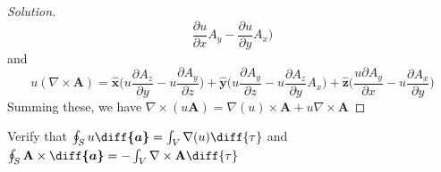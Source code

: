 \documentclass[crop=false,class=article,oneside]{standalone}
\begin{document}
\begin{proof}[Solution]
\begin{equation*}
                    \frac{\partial u}{\partial x}A_{y}
                    -\frac{\partial u}{\partial y}A_{x}
                \big)
            \end{equation*}
            and
            \begin{equation*}
                u(\nabla\times\mathbf{A})
                =\hat{\mathbf{x}}\big(
                    u\frac{\partial{A_{z}}}{\partial{y}}
                    -u\frac{\partial{A_{y}}}{\partial{z}}
                \big)
                +\hat{\mathbf{y}}\big(
                    u\frac{\partial{A_{y}}}{\partial{z}}
                    -u\frac{\partial{A_{z}}}{\partial{y}}A_{x}
                \big)
                +\hat{\mathbf{z}}\big(
                    \frac{u\partial{A_{y}}}{\partial{x}}
                    -u\frac{\partial{A_{x}}}{\partial{y}}
                \big)
            \end{equation*}
            Summing these, we have
            $\nabla\times(u\mathbf{A})%
             =\nabla(u)\times\mathbf{A}%
             +u\nabla\times\mathbf{A}$
        \end{proof}
        \begin{problem}[Wangsness 1-26]
            Verify that
            $\oint_{S}u\boldsymbol{\diff{a}}%
             =\int_{V}\nabla(u)\diff{\tau}$
            and
            $\oint_{S}\mathbf{A}\times\boldsymbol{\diff{a}}%
             =-\int_{V}\nabla\times\mathbf{A}\diff{\tau}$
        \end{problem}
\end{document}
